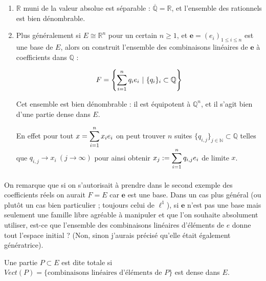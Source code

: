	\begin{myexmpl}
		\leavevmode
		\begin{enumerate}
			\item $\mathbb{R}$ muni de la valeur absolue est séparable : $\overline{\mathbb{Q}} = \mathbb{R}$, et l'ensemble des rationnels est bien dénombrable.
			
			\item Plus généralement si $E \cong \mathbb{R}^n$ pour un certain $n \geqslant 1$, et $\mathbf{e}=(e_i)_{1 \leqslant i \leqslant n}$ est une base de $E$, alors on construit l'ensemble des combinaisons linéaires de $\mathbf{e}$ à coefficients dans $\mathbb{Q}$ :
			
			$$F = \left\{\displaystyle \sum_{i = 1}^{n} q_i e_i ~ | ~ \{q_i\}_i \subset \mathbb{Q} \right\}$$
			
			Cet ensemble est bien dénombrable : il est équipotent à $\mathbb{Q}^n$, et il s'agit bien d'une partie dense dans $E$.
			
			En effet pour tout $\displaystyle x = \sum_{i = 1}^n x_i e_i$ on peut trouver $n$ suites $\{q_{i, j}\}_{j \in \mathbb{N}} \subset \mathbb{Q}$ telles que $q_{i, j} \to x_i ~ (j \to \infty)$ pour ainsi obtenir $\displaystyle x_j := \sum_{i = 1}^{n} q_{i, j} e_i$ de limite $x$.
		\end{enumerate}
	\end{myexmpl}
	
	\paragraph*{}
	
	On remarque que si on s'autorisait à prendre dans le second exemple des coefficients réels on aurait $F = E$ car $\mathbf{e}$ est une base. Dans un cas plus général (ou plutôt un cas bien particulier ; toujours celui de $\ell^1$), si $\mathbf{e}$ n'est pas une base mais seulement une famille libre agréable à manipuler et que l'on souhaite absolument utiliser, est-ce que l'ensemble des combinaisons linéaires d'éléments de $e$ donne tout l'espace initial ? (Non, sinon j'aurais précisé qu'elle était également génératrice).
		
	\begin{mydef}
		Une partie $P \subset E$ est dite totale si $Vect(P) = \{\text{combinaisons linéaires d'éléments de $P$}\}$ est dense dans $E$.
	\end{mydef}
	
